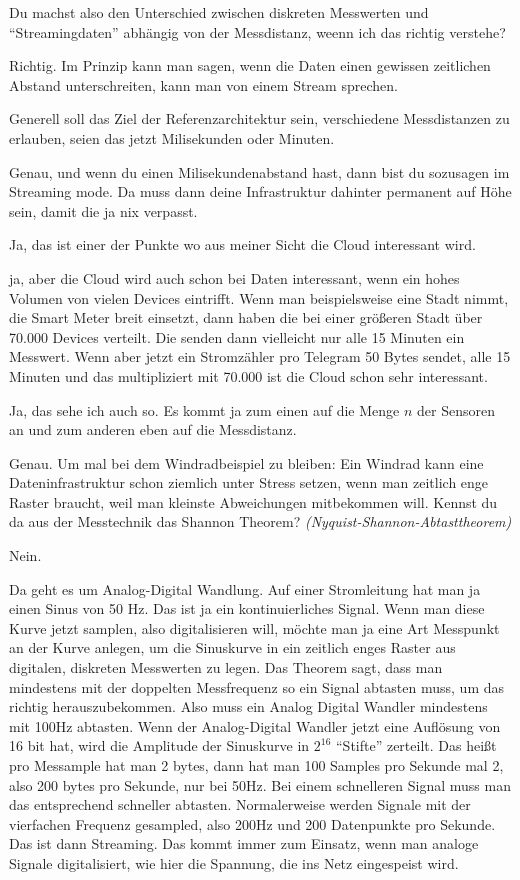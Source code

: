 \LF Du machst also den Unterschied zwischen diskreten Messwerten und \enquote{Streamingdaten} abhängig von der Messdistanz, weenn ich das richtig verstehe?

\PE Richtig. Im Prinzip kann man sagen, wenn die Daten einen gewissen zeitlichen Abstand unterschreiten, kann man von einem Stream sprechen. 

\LF Generell soll das Ziel der Referenzarchitektur sein, verschiedene Messdistanzen zu erlauben, seien das jetzt Milisekunden oder Minuten.

\PE Genau, und wenn du einen Milisekundenabstand hast, dann bist du sozusagen im Streaming mode. Da muss dann deine Infrastruktur dahinter permanent auf Höhe sein, damit die ja nix verpasst. 

\LF Ja, das ist einer der Punkte wo aus meiner Sicht die Cloud interessant wird.

\PE ja, aber die Cloud wird auch schon bei Daten interessant, wenn ein hohes Volumen von vielen Devices eintrifft. Wenn man beispielsweise eine Stadt nimmt, die Smart Meter breit einsetzt, dann haben die bei einer größeren Stadt über 70.000 Devices verteilt. Die senden dann vielleicht nur alle 15 Minuten ein Messwert. Wenn aber jetzt ein Stromzähler pro Telegram 50 Bytes sendet, alle 15 Minuten und das multipliziert mit 70.000 ist die Cloud schon sehr interessant.

\LF Ja, das sehe ich auch so. Es kommt ja zum einen auf die Menge $n$ der Sensoren an und zum anderen eben auf die Messdistanz.

\PE Genau. Um mal bei dem Windradbeispiel zu bleiben: Ein Windrad kann eine Dateninfrastruktur schon ziemlich unter Stress setzen, wenn man zeitlich enge Raster braucht, weil man kleinste Abweichungen mitbekommen will. Kennst du da aus der Messtechnik das Shannon Theorem? \textit{(Nyquist-Shannon-Abtasttheorem)}

\LF Nein.

\PE Da geht es um Analog-Digital Wandlung. Auf einer Stromleitung hat man ja einen Sinus von 50 Hz. Das ist ja ein kontinuierliches Signal. Wenn man diese Kurve jetzt samplen, also digitalisieren will, möchte man ja eine Art Messpunkt an der Kurve anlegen, um die Sinuskurve in ein zeitlich enges Raster aus digitalen, diskreten Messwerten zu legen. Das Theorem sagt, dass man mindestens  mit der doppelten Messfrequenz so ein Signal abtasten muss, um das richtig herauszubekommen. Also muss ein Analog Digital Wandler mindestens mit 100Hz abtasten. Wenn der Analog-Digital Wandler jetzt eine Auflösung von 16 bit hat, wird die Amplitude der Sinuskurve in $2^{16}$ \enquote{Stifte} zerteilt. Das heißt pro Messample hat man 2 bytes, dann hat man 100 Samples pro Sekunde mal 2, also 200 bytes pro Sekunde, nur bei 50Hz. Bei einem schnelleren Signal muss man das entsprechend schneller abtasten. Normalerweise werden Signale mit der vierfachen Frequenz gesampled, also 200Hz und 200 Datenpunkte pro Sekunde. Das ist dann Streaming. Das kommt immer zum Einsatz, wenn man analoge Signale digitalisiert, wie hier die Spannung, die  ins Netz eingespeist wird.

